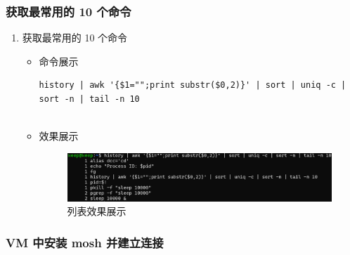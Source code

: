 \documentclass[UTF8]{ctexart}
\begin{document}
\subsubsection{获取最常用的 10 个命令}

\begin{enumerate}
  \item 获取最常用的 10 个命令
  \begin{itemize}
  \item 命令展示
  \begin{verbatim}
history | awk '{$1="";print substr($0,2)}' | sort | uniq -c | sort -n | tail -n 10


  \end{verbatim}
\item 效果展示
 \begin{figure}[H]
    \centering
    \includegraphics[width=\textwidth]{2} %
    \caption{列表效果展示}
  \end{figure}
  \end{itemize}
\end{enumerate}

\subsubsection{VM 中安装 mosh 并建立连接}
\end{document}
